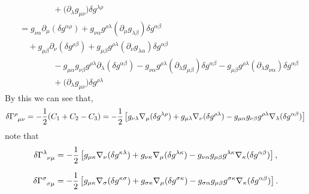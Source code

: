 \documentclass{article}
\theoremstyle{definition}
\def\t{\tensor}
\begin{document}
\begin{align}
                    & \qquad \qquad + \big( \partial_\lambda g_{\mu \nu} \big)\delta g^{\lambda\rho} 
                    \\
                    &= g_{\nu\alpha} \partial_\mu (\delta g^{\alpha\rho}) + g_{\nu\alpha} g^{\rho\lambda} (\partial_\mu g_{\lambda \beta}) \delta g^{\alpha \beta}  \nonumber \\
                    & \quad+ g_{\mu\beta} \partial_\nu (\delta g^{\rho\beta}) +g_{\mu\beta} g^{\rho \lambda} (\partial_\nu g_{\lambda \alpha})  \delta g^{\alpha\beta}  \nonumber \\
                    & \qquad \qquad - g_{\mu\alpha} g_{\nu\beta} g^{\rho\lambda} \partial_\lambda (\delta g^{\alpha\beta} ) -g_{\nu\alpha} g^{\rho\lambda} ( \partial_\lambda g_{\mu\beta} ) \delta g^{\alpha \beta} -g_{\mu\beta} g^{\rho \lambda} ( \partial_\lambda g_{\nu\alpha}) \delta g^{\alpha\beta} \nonumber \\
                    & \qquad \qquad + \big( \partial_\lambda g_{\mu \nu} \big)\delta g^{\rho\lambda} 
\end{align}
By this we can see that,
\begin{equation}
    \delta \t{\Gamma}{^\rho_\mu_\nu} = -\frac{1}{2} (C_1 + C_2 - C_3 ) = - \frac{1}{2} \left[ g_{\nu\lambda} \nabla_\mu (\delta g^{\lambda \rho}) + g_{\mu\lambda}\nabla_\nu (\delta g^{\rho \lambda}) - g_{\mu\alpha}g_{\nu\beta} g^{\rho\lambda} \nabla_\lambda (\delta g^{\alpha\beta}) \right]
\end{equation}
note that
\begin{equation}
    \delta \t{\Gamma}{^\lambda_\nu_\mu} = - \frac{1}{2} \left[ g_{\mu\kappa} \nabla_\nu (\delta g^{\kappa \lambda}) + g_{\nu\kappa}\nabla_\mu (\delta g^{\lambda \kappa}) - g_{\nu\alpha}g_{\mu\beta} g^{\lambda\kappa} \nabla_\kappa (\delta g^{\alpha\beta}) \right],
\end{equation}

\begin{equation}
    \delta \t{\Gamma}{^\sigma_\sigma_\mu} = - \frac{1}{2} \left[ g_{\mu\kappa} \nabla_\sigma (\delta g^{\kappa \sigma}) + g_{\sigma\kappa}\nabla_\mu (\delta g^{\sigma \kappa}) - g_{\sigma\alpha}g_{\mu\beta} g^{\sigma\kappa} \nabla_\kappa (\delta g^{\alpha\beta}) \right].
\end{equation}
\end{document}
